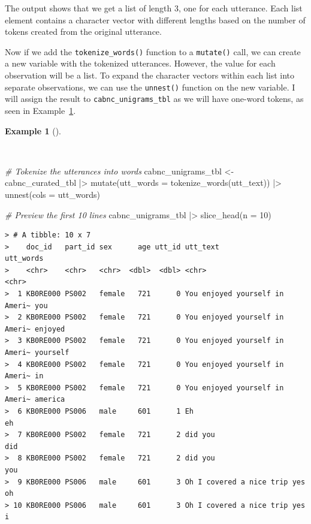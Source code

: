 \documentclass[
  letterpaper,
  DIV=11,
  numbers=noendperiod]{scrreport}
\newenvironment{Shaded}{\begin{snugshade}}{\end{snugshade}}
\newcommand{\AttributeTok}[1]{\textcolor[rgb]{0.00,0.00,0.00}{#1}}
\newcommand{\CommentTok}[1]{\textcolor[rgb]{0.00,0.00,0.00}{\textit{#1}}}
\newcommand{\DecValTok}[1]{\textcolor[rgb]{0.00,0.00,0.00}{#1}}
\newcommand{\FunctionTok}[1]{\textcolor[rgb]{0.00,0.00,0.00}{#1}}
\newcommand{\NormalTok}[1]{\textcolor[rgb]{0.00,0.00,0.00}{#1}}
\newcommand{\OtherTok}[1]{\textcolor[rgb]{0.00,0.00,0.00}{#1}}
\newcommand{\SpecialCharTok}[1]{\textcolor[rgb]{0.00,0.00,0.00}{#1}}
\theoremstyle{definition}
\newtheorem{example}{Example}[chapter]
\theoremstyle{remark}
\begin{document}
The output shows that we get a list of length 3, one for each utterance.
Each list element contains a character vector with different lengths
based on the number of tokens created from the original utterance.

Now if we add the \texttt{tokenize\_words()} function to a
\texttt{mutate()} call, we can create a new variable with the tokenized
utterances. However, the value for each observation will be a list. To
expand the character vectors within each list into separate
observations, we can use the \texttt{unnest()} function on the new
variable. I will assign the result to \texttt{cabnc\_unigrams\_tbl} as
we will have one-word tokens, as seen in
Example~\ref{exm-td-cabnc-tokenization-words}.

\begin{example}[]\protect\hypertarget{exm-td-cabnc-tokenization-words}{}\label{exm-td-cabnc-tokenization-words}

~

\begin{Shaded}
\begin{Highlighting}[]
\CommentTok{\# Tokenize the utterances into words}
\NormalTok{cabnc\_unigrams\_tbl }\OtherTok{\textless{}{-}} 
\NormalTok{  cabnc\_curated\_tbl }\SpecialCharTok{|\textgreater{}}
  \FunctionTok{mutate}\NormalTok{(}\AttributeTok{utt\_words =} \FunctionTok{tokenize\_words}\NormalTok{(utt\_text)) }\SpecialCharTok{|\textgreater{}}
  \FunctionTok{unnest}\NormalTok{(}\AttributeTok{cols =}\NormalTok{ utt\_words)}

\CommentTok{\# Preview the first 10 lines}
\NormalTok{cabnc\_unigrams\_tbl }\SpecialCharTok{|\textgreater{}}
  \FunctionTok{slice\_head}\NormalTok{(}\AttributeTok{n =} \DecValTok{10}\NormalTok{)}
\end{Highlighting}
\end{Shaded}

\begin{verbatim}
> # A tibble: 10 x 7
>    doc_id   part_id sex      age utt_id utt_text                       utt_words
>    <chr>    <chr>   <chr>  <dbl>  <dbl> <chr>                          <chr>    
>  1 KB0RE000 PS002   female   721      0 You enjoyed yourself in Ameri~ you      
>  2 KB0RE000 PS002   female   721      0 You enjoyed yourself in Ameri~ enjoyed  
>  3 KB0RE000 PS002   female   721      0 You enjoyed yourself in Ameri~ yourself 
>  4 KB0RE000 PS002   female   721      0 You enjoyed yourself in Ameri~ in       
>  5 KB0RE000 PS002   female   721      0 You enjoyed yourself in Ameri~ america  
>  6 KB0RE000 PS006   male     601      1 Eh                             eh       
>  7 KB0RE000 PS002   female   721      2 did you                        did      
>  8 KB0RE000 PS002   female   721      2 did you                        you      
>  9 KB0RE000 PS006   male     601      3 Oh I covered a nice trip yes   oh       
> 10 KB0RE000 PS006   male     601      3 Oh I covered a nice trip yes   i
\end{verbatim}

\end{example}
\end{document}
